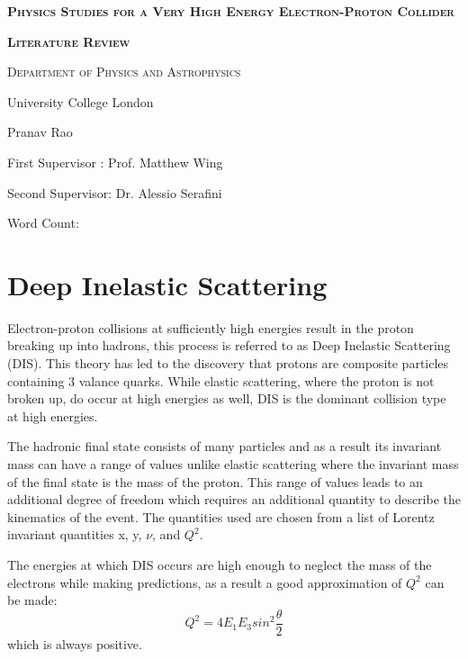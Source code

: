\documentclass[journal, a4paper,12pt]{IEEEtran}
\begin{document}
\begin{titlepage}
	\centering
    \vspace{2cm}
    {\scshape\LARGE\bfseries Physics Studies for a Very High Energy Electron-Proton Collider\par}
	{\scshape\Large\bfseries Literature Review\par}
	\vspace{2cm}
	{\scshape\Large Department of Physics and Astrophysics\par University College London\par}
	\vspace{2cm}
	{\huge\bfseries\par}
	{\large Pranav Rao\par}
	{\large First Supervisor : Prof. Matthew Wing\par Second Supervisor: Dr. Alessio Serafini\par}
	\vspace{10cm}
	Word Count: 

	\vfill
\end{titlepage}

    
\justify

\section{Deep Inelastic Scattering}

Electron-proton collisions at sufficiently high energies result in the proton breaking up into hadrons, this process is referred to as Deep Inelastic Scattering (DIS). This theory has led to the discovery that protons are composite particles containing 3 valance quarks. While elastic scattering, where the proton is not broken up, do occur at high energies as well, DIS is the dominant collision type at high energies.

The hadronic final state consists of many particles and as a result its invariant mass can have a range of values unlike elastic scattering where the invariant mass of the final state is the mass of the proton. This range of values leads to an additional degree of freedom which requires an additional quantity to describe the kinematics of the event. The quantities used are chosen from a list of Lorentz invariant quantities x, y, $\nu$, and $Q^2$. 

The energies at which DIS occurs are high enough to neglect the mass of the electrons while making predictions, as a result a good approximation of $Q^2$ can be made:
\begin{equation}
	Q^2 = 4E_1E_3sin^2\frac{\theta}{2}
\end{equation}
which is always positive.
\end{document}
